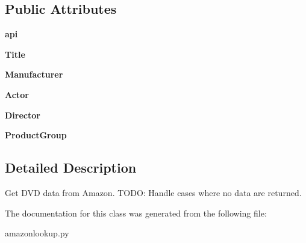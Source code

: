 \subsection*{Public Attributes}
\begin{DoxyCompactItemize}
\item 
\hypertarget{classamazonlookup_1_1DVDlookup_aed5d55b2021546ce82356ec8d7cac1e1}{
{\bfseries api}}
\label{classamazonlookup_1_1DVDlookup_aed5d55b2021546ce82356ec8d7cac1e1}

\item 
\hypertarget{classamazonlookup_1_1DVDlookup_ad1e144ffabbe30f208a8753a1950f99c}{
{\bfseries Title}}
\label{classamazonlookup_1_1DVDlookup_ad1e144ffabbe30f208a8753a1950f99c}

\item 
\hypertarget{classamazonlookup_1_1DVDlookup_ae2ec22eb3995bfef413f8f8587f566ef}{
{\bfseries Manufacturer}}
\label{classamazonlookup_1_1DVDlookup_ae2ec22eb3995bfef413f8f8587f566ef}

\item 
\hypertarget{classamazonlookup_1_1DVDlookup_a5b157bf96f97ce95bc26ffdda59f998c}{
{\bfseries Actor}}
\label{classamazonlookup_1_1DVDlookup_a5b157bf96f97ce95bc26ffdda59f998c}

\item 
\hypertarget{classamazonlookup_1_1DVDlookup_a9ede510e3c2ad1d7101278ca8308b980}{
{\bfseries Director}}
\label{classamazonlookup_1_1DVDlookup_a9ede510e3c2ad1d7101278ca8308b980}

\item 
\hypertarget{classamazonlookup_1_1DVDlookup_aa0c01f3325ffdd43870c2d36d8949e4c}{
{\bfseries ProductGroup}}
\label{classamazonlookup_1_1DVDlookup_aa0c01f3325ffdd43870c2d36d8949e4c}

\end{DoxyCompactItemize}


\subsection{Detailed Description}
\begin{DoxyVerb}
Get DVD data from Amazon.
TODO: Handle cases where no data are returned.
\end{DoxyVerb}
 

The documentation for this class was generated from the following file:\begin{DoxyCompactItemize}
\item 
amazonlookup.py\end{DoxyCompactItemize}

